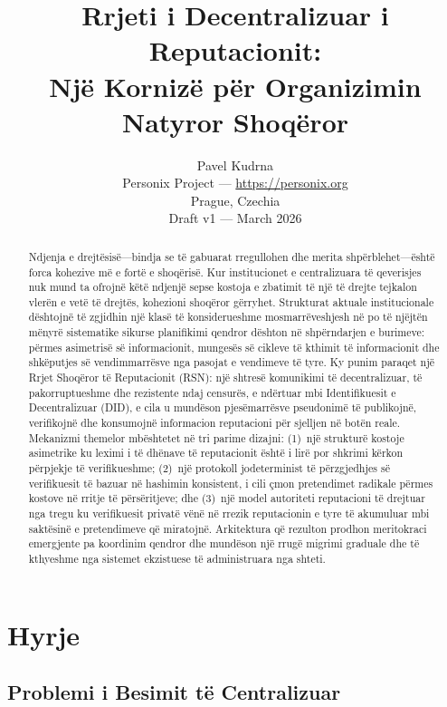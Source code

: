 \documentclass[11pt,a4paper,twocolumn]{article}
\title{\textbf{Rrjeti i Decentralizuar i Reputacionit:\\Një Kornizë për Organizimin Natyror Shoqëror}}
\author{Pavel Kudrna\\Personix Project --- \url{https://personix.org}\\Prague, Czechia\\Draft v1 --- March 2026}
\date{}
\begin{document}
\maketitle

\begin{abstract}
Ndjenja e drejtësisë---bindja se të gabuarat rregullohen dhe merita shpërblehet---është forca kohezive më e fortë e shoqërisë. Kur institucionet e centralizuara të qeverisjes nuk mund ta ofrojnë këtë ndjenjë sepse kostoja e zbatimit të një të drejte tejkalon vlerën e vetë të drejtës, kohezioni shoqëror gërryhet. Strukturat aktuale institucionale dështojnë të zgjidhin një klasë të konsiderueshme mosmarrëveshjesh në po të njëjtën mënyrë sistematike sikurse planifikimi qendror dështon në shpërndarjen e burimeve: përmes asimetrisë së informacionit, mungesës së cikleve të kthimit të informacionit dhe shkëputjes së vendimmarrësve nga pasojat e vendimeve të tyre. Ky punim paraqet një Rrjet Shoqëror të Reputacionit (RSN): një shtresë komunikimi të decentralizuar, të pakorruptueshme dhe rezistente ndaj censurës, e ndërtuar mbi Identifikuesit e Decentralizuar (DID), e cila u mundëson pjesëmarrësve pseudonimë të publikojnë, verifikojnë dhe konsumojnë informacion reputacioni për sjelljen në botën reale. Mekanizmi themelor mbështetet në tri parime dizajni: (1)~një strukturë kostoje asimetrike ku leximi i të dhënave të reputacionit është i lirë por shkrimi kërkon përpjekje të verifikueshme; (2)~një protokoll jodeterminist të përzgjedhjes së verifikuesit të bazuar në hashimin konsistent, i cili çmon pretendimet radikale përmes kostove në rritje të përsëritjeve; dhe (3)~një model autoriteti reputacioni të drejtuar nga tregu ku verifikuesit privatë vënë në rrezik reputacionin e tyre të akumuluar mbi saktësinë e pretendimeve që miratojnë. Arkitektura që rezulton prodhon meritokraci emergjente pa koordinim qendror dhe mundëson një rrugë migrimi graduale dhe të kthyeshme nga sistemet ekzistuese të administruara nga shteti.
\end{abstract}

\section{Hyrje}

\subsection{Problemi i Besimit të Centralizuar}
\end{document}
